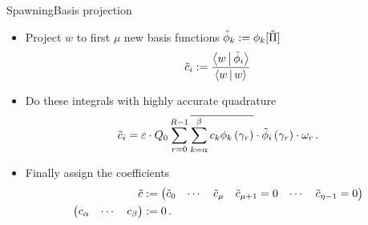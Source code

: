 \documentclass{beamer}
\begin{document}
\begin{frame}{Spawning}{Basis projection}
  \begin{itemize}
    \item Project $w$ to first $\mu$ new basis functions $\tilde{\phi}_k := \phi_k[\tilde{\Pi}]$
    \begin{equation*}
      \tilde{c}_i := \frac{\Braket{w|\tilde{\phi}_i}}{\Braket{w|w}}
    \end{equation*}
    \item Do these integrals with highly accurate quadrature
    \begin{equation*}
      \tilde{c}_i = \varepsilon \cdot Q_0 \sum_{r=0}^{R-1} \overline{\sum_{k=\alpha}^\beta c_k \phi_k\left( \gamma_r \right)} \cdot \tilde{\phi}_i \left( \gamma_r \right) \cdot \omega_r \,.
    \end{equation*}
    \item Finally assign the coefficients
    \begin{equation*}
    \begin{split}
      \tilde{c} & :=
      \begin{pmatrix}
        \tilde{c}_0 & \cdots & \tilde{c}_{\mu} & \tilde{c}_{\mu+1} = 0 & \cdots & \tilde{c}_{\eta-1} = 0
      \end{pmatrix} \\
      \begin{pmatrix}
        c_\alpha & \cdots & c_\beta
      \end{pmatrix} & := 0 \,.
    \end{split}
    \end{equation*}
  \end{itemize}
\end{frame}
\end{document}
